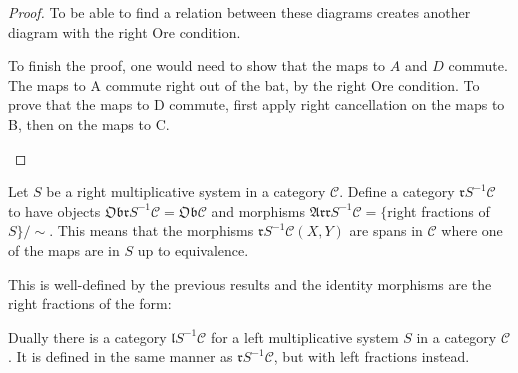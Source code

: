 \begin{proof}
        To be able to find a relation between these diagrams creates another diagram with the right Ore condition.
        \begin{center}
            \begin{minipage}[c]{0.3\textwidth}
            \end{minipage}
            \begin{minipage}[c]{0.5\textwidth}
                To finish the proof, one would need to show that the maps to $A$ and $D$ commute. The maps to A commute right out of the bat, by the right Ore condition. To prove that the maps to D commute, first apply right cancellation on the maps to B, then on the maps to C.
            \end{minipage}
        \end{center}
    \end{proof}

    \begin{definition}
        Let $S$ be a right multiplicative system in a category $\mathcal{C}$. Define a category $\mathfrak{r}S^{-1}\mathcal{C}$ to have objects $\mathfrak{Obr}S^{-1}\mathcal{C}=\mathfrak{Ob}\mathcal{C}$ and morphisms $\mathfrak{Arr}S^{-1}\mathcal{C} = \{$right fractions of $S\}/\sim$. This means that the morphisms $\mathfrak{r}S^{-1}\mathcal{C}(X,Y)$ are spans in $\mathcal{C}$ where one of the maps are in $S$ up to equivalence.
        \begin{center}
        \end{center}
        This is well-defined by the previous results and the identity morphisms are the right fractions of the form:
        \begin{center}
        \end{center}
    \end{definition}

    \begin{remark}
        Dually there is a category $\mathfrak{l}S^{-1}\mathcal{C}$ for a left multiplicative system $S$ in a category $\mathcal{C}$. It is defined in the same manner as $\mathfrak{r}S^{-1}\mathcal{C}$, but with left fractions instead.
    \end{remark}

